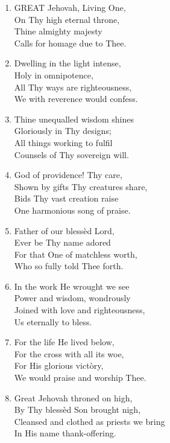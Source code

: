 \documentclass[11pt,a4paper]{article}
\begin{document}
\begin{enumerate}
    \item GREAT Jehovah, Living One, \\
        On Thy high eternal throne, \\
        Thine almighty majesty \\
        Calls for homage due to Thee.

    \item Dwelling in the light intense, \\
        Holy in omnipotence, \\
        All Thy ways are righteousness, \\
        We with reverence would confess.

    \item Thine unequalled wisdom shines \\
        Gloriously in Thy designs; \\
        All things working to fulfil \\
        Counsels of Thy sovereign will.

    \item God of providence! Thy care, \\
        Shown by gifts Thy creatures share, \\
        Bids Thy vast creation raise \\
        One harmonious song of praise.

    \item Father of our bless\`ed Lord, \\
        Ever be Thy name adored \\
        For that One of matchless worth, \\
        Who so fully told Thee forth.

    \item In the work He wrought we see \\
        Power and wisdom, wondrously \\
        Joined with love and righteousness, \\
        Us eternally to bless.

    \item For the life He lived below, \\
        For the cross with all its woe, \\
        For His glorious vict\`ory, \\
        We would praise and worship Thee.

    \item[\textbf{8.\textdagger{}}] Great Jehovah throned on high, \\
        By Thy bless\`ed Son brought nigh, \\
        Cleansed and clothed as priests we bring \\
        In His name thank-offering.

\end{enumerate}
\end{document}
